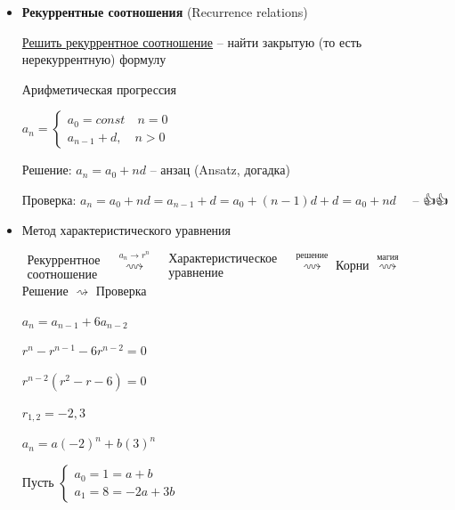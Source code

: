 \documentclass[12pt]{article}
\begin{document}
    \begin{itemize}
        \hypertarget{recurrencerelations}{}

        \item \textbf{Рекуррентные соотношения} (Recurrence relations)

        \underline{Решить рекуррентное соотношение} -- найти закрытую (то есть нерекуррентную) формулу

        \Ex Арифметическая прогрессия

        $a_n = \begin{cases}a_0 = const \quad n = 0 \\ a_{n - 1} + d, \quad n > 0\end{cases}$

        Решение: $a_n = a_0 + nd$ -- анзац (Ansatz, догадка)

        Проверка: $a_n = a_0 + nd = a_{n - 1} + d = a_0 + (n - 1)d + d = a_0 + nd \quad$ -- {\Large👍👍}

        \item Метод характеристического уравнения

        $\substack{\text{Рекуррентное} \\ \text{соотношение}}$ \ $\stackrel{a_n \to r^n}{\rightsquigarrow}$ \ $\substack{\text{Характеристическое} \\ \text{уравнение}}$ \ $\stackrel{\text{решение}}{\rightsquigarrow}$ Корни $\stackrel{\text{магия}}{\rightsquigarrow}$ Решение $\rightsquigarrow$ Проверка

        \Ex $a_n = a_{n - 1} + 6a_{n - 2}$

        $r^n - r^{n - 1} - 6r^{n - 2} = 0$

        $r^{n-  2} (r^2 - r - 6) = 0$

        $r_{1,2} = -2, 3$


        \vspace{3mm}

        $a_n = a(-2)^n + b(3)^n$

        Пусть $\begin{cases}a_0 = 1 = a + b \\ a_1 = 8 = -2a + 3b\end{cases}$


\end{itemize}
\end{document}
